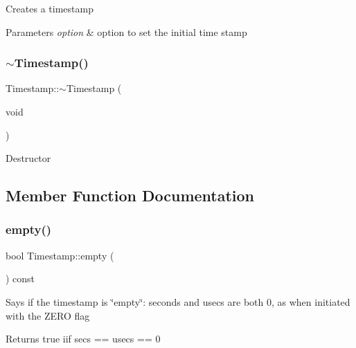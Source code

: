 Creates a timestamp 
\begin{DoxyParams}{Parameters}
{\em option} & option to set the initial time stamp \\
\hline
\end{DoxyParams}
\mbox{\label{class_d_utils_1_1_timestamp_a06ea20fe67d9e7177818ba219ea3137f}} 
\subsubsection{\texorpdfstring{$\sim$\+Timestamp()}{~Timestamp()}}
{\footnotesize\ttfamily Timestamp\+::$\sim$\+Timestamp (\begin{DoxyParamCaption}\item[{void}]{ }\end{DoxyParamCaption})\hspace{0.3cm}{\ttfamily [virtual]}}

Destructor 

\subsection{Member Function Documentation}
\mbox{\label{class_d_utils_1_1_timestamp_a0aaa878aee63c543dea866892c003a62}} 
\subsubsection{\texorpdfstring{empty()}{empty()}}
{\footnotesize\ttfamily bool Timestamp\+::empty (\begin{DoxyParamCaption}{ }\end{DoxyParamCaption}) const}

Says if the timestamp is \char`\"{}empty\char`\"{}\+: seconds and usecs are both 0, as when initiated with the Z\+E\+RO flag \begin{DoxyReturn}{Returns}
true iif secs == usecs == 0 
\end{DoxyReturn}
\mbox{\label{class_d_utils_1_1_timestamp_ad2ce60eeec43f9fa86379ed8b269ab64}} 
